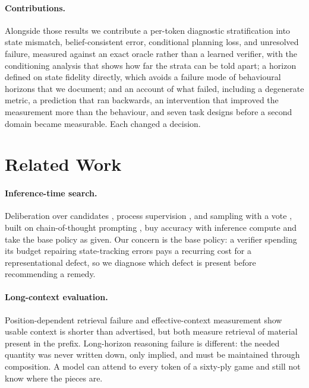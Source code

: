 \documentclass[manuscript, screen, review]{jair}
\theoremstyle{remark}
\begin{document}
\paragraph{Contributions.}
Alongside those results we contribute a per-token diagnostic stratification into state mismatch,
belief-consistent error, conditional planning loss, and unresolved failure,
measured against an exact oracle rather than a learned verifier, with the
conditioning analysis that shows how far the strata can be told apart; a horizon
defined on state fidelity directly, which avoids a failure mode of behavioural
horizons that we document; and an account of what failed, including a degenerate
metric, a prediction that ran backwards, an intervention that improved the
measurement more than the behaviour, and seven task designs before a second
domain became measurable. Each changed a decision.

\section{Related Work}

\paragraph{Inference-time search.}
Deliberation over candidates \citep{yao2023tree}, process supervision
\citep{lightman2024lets}, and sampling with a vote
\citep{wang2023selfconsistency}, built on chain-of-thought prompting
\citep{wei2022chain}, buy accuracy with inference compute and take the base
policy as given. Our concern is the base policy: a verifier spending its budget
repairing state-tracking errors pays a recurring cost for a representational
defect, so we diagnose which defect is present before recommending a remedy.

\paragraph{Long-context evaluation.}
Position-dependent retrieval failure \citep{liu2024lost} and effective-context
measurement \citep{hsieh2024ruler} show usable context is shorter than advertised,
but both measure retrieval of material present in the prefix. Long-horizon
reasoning failure is different: the needed quantity was never written down, only
implied, and must be maintained through composition. A model can attend to every
token of a sixty-ply game and still not know where the pieces are.
\end{document}
